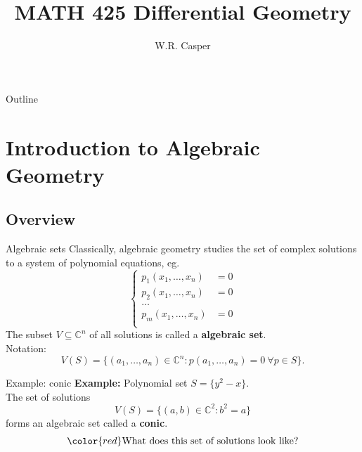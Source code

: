 \documentclass{beamer}
\title{MATH 425 Differential Geometry}
\subtitle
{} %
\author[W.R. Casper] %
{W.R. Casper}
\institute[California State University Fullerton] %
{
  Department of Mathematics\\
  California State University Fullerton}
\begin{document}
\begin{frame}
  \titlepage
\end{frame}

\begin{frame}{Outline}
  \tableofcontents
\end{frame}



\section{Introduction to Algebraic Geometry}

\subsection{Overview}

\begin{frame}{Algebraic sets}
Classically, algebraic geometry studies the set of complex solutions to a system of polynomial equations, eg.
$$\left\lbrace
\begin{array}{cc}
p_1(x_1,\dots, x_n) &= 0\\
p_2(x_1,\dots, x_n) &= 0\\
\dots\\
p_m(x_1,\dots, x_n) &= 0\\
\end{array}
\right.$$
\pause
The subset $V\subseteq\mathbb C^n$ of all solutions is called a \textbf{algebraic set}.\\
\pause
{\color{red}Notation:}
$$V(S) = \{(a_1,\dots, a_n)\in\mathbb{C}^n: p(a_1,\dots, a_n) = 0\ \forall p\in S\}.$$
\end{frame}

\begin{frame}{Example: conic}
\textbf{Example:}
Polynomial set $S = \{y^2-x\}$.\\
\pause
The set of solutions
$$V(S) = \{(a,b)\in\mathbb{C}^2: b^2=a\}$$
forms an algebraic set called a \textbf{conic}.\\
\pause
$${\color{red}\text{What does this set of solutions look like?}}$$ 
\end{frame}
\end{document}
